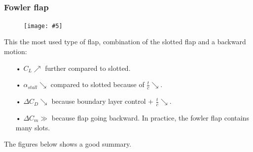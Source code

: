 \documentclass[british,french,11pt, a4paper, openany]{article}
\newcommand{\wrapfig}[6]{%
	\begin{figure}%
		\vspace{-5mm}%
		\texttt{[image: \#5]}%
		\captionof{figure}{}%
		\label{#6}%
	\end{figure}%
}
\begin{document}
\ \\

\subsubsection{Fowler flap}
\wrapfig{6}{r}{4}{0.1}{ch5/4}{ch5/4}
This the most used type of flap, combination of the slotted flap and a backward motion: 

\begin{itemize}
	\item[•] $C_L \nearrow$ further compared to slotted.  
	\item[•] $\alpha _{stall} \searrow$ compared to slotted because of $\frac{t}
	{c}\searrow$.
	\item[•] $\Delta C_D \searrow$ because boundary layer control + $\frac{t}{c} \searrow$.
	\item[•] $\Delta C_m \gg$ because flap going backward. In practice, the fowler flap contains many slots. 
\end{itemize}

The figures below shows a good summary. 
\end{document}
